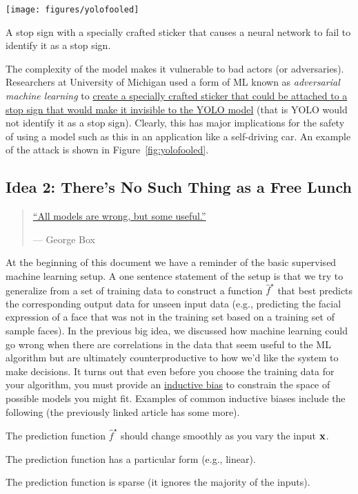 \documentclass[assignment01_Solutions]{subfiles}
\begin{document}
\begin{marginfigure}
\texttt{[image: figures/yolofooled]}
\caption{A stop sign with a specially crafted sticker that causes a neural network to fail to identify it as a stop sign.}\label{fig:yolofooled}
\end{marginfigure}
The complexity of the model makes it vulnerable to bad actors (or adversaries).  Researchers at University of Michigan used a form of ML known as \emph{adversarial machine learning} to \href{https://iotsecurity.engin.umich.edu/physical-adversarial-examples-for-object-detectors/}{create a specially crafted sticker that could be attached to a stop sign that would make it invisible to the YOLO model} (that is YOLO would not identify it as a stop sign).  Clearly, this has major implications for the safety of using a model such as this in an application like a self-driving car.   An example of the attack is shown in Figure~\ref{fig:yolofooled}.

\ei

\subsection*{Idea 2: There's No Such Thing as a Free Lunch}

\begin{quotation}
\href{https://en.wikipedia.org/wiki/All_models_are_wrong}{``All models are wrong, but some useful.''}

--- George Box
\end{quotation}

At the beginning of this document we have a reminder of the basic supervised machine learning setup.  A one sentence statement of the setup is that we try to generalize from a set of training data to construct a function $\hat{f}^\star$ that best predicts the corresponding output data for unseen input data (e.g., predicting the facial expression of a face that was not in the training set based on a training set of sample faces).  In the previous big idea, we discussed how machine learning could go wrong when there are correlations in the data that seem useful to the ML algorithm but are ultimately counterproductive to how we'd like the system to make decisions.  It turns out that even before you choose the training data for your algorithm, you must provide an \href{https://en.wikipedia.org/wiki/Inductive_bias}{inductive bias} to constrain the space of possible models you might fit.  Examples of common inductive biases include the following (the previously linked article has some more).
\be
\item The prediction function $\hat{f}^\star$ should change smoothly as you vary the input $\mathbf{x}$.
\item The prediction function has a particular form (e.g., linear).
\item The prediction function is sparse (it ignores the majority of the inputs).
\ee
\end{document}
